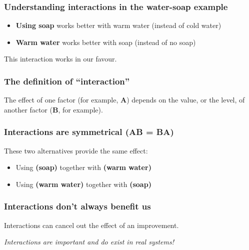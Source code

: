 \begin{frame}\frametitle{Understanding interactions in the water-soap example}
	\begin{itemize}
		\item	\textbf{Using soap} works better with warm water (instead of cold water)

		
		\vspace{24pt}
		\pause
		\item	\textbf{Warm water} works better with soap (instead of no soap)
			
	\end{itemize}
	\pause
	\vspace{24pt}
	This interaction works in our favour.
\end{frame}

\begin{frame}\frametitle{The definition of ``interaction''}
	\begin{exampleblock}{}
		The effect of one factor (for example, \textbf{A}) depends on the value, or the level, of another factor (\textbf{B}, for example).
	\end{exampleblock}
\end{frame}

\begin{frame}\frametitle{Interactions are symmetrical (\textbf{AB} = \textbf{BA})}
	These two alternatives provide the same effect: \vspace{24pt}
	\begin{itemize}
		\item	Using \textbf{(soap)} together with \textbf{(warm water)} 
		\vspace{12pt}
		\item	Using \textbf{(warm water)} together with \textbf{(soap)}  
	\end{itemize}
\end{frame}

\begin{frame}\frametitle{Interactions don't always benefit us}
	
	Interactions can cancel out the effect of an improvement. 
	
	\vspace{24pt}
	{\color{myOrange} 	\emph{Interactions are important and do exist in real systems!}}
\end{frame}

